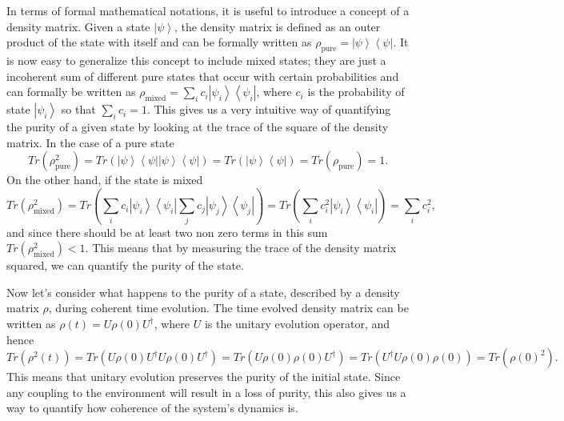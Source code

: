 In terms of formal mathematical notations, it is useful to introduce a concept of a density matrix. Given a state $\left|\psi \right>$, the density matrix is defined as an outer product of the state with itself and can be formally written as $\rho_{\mathrm{pure}} = \left|\psi \right> \left< \psi \right|$. It is now easy to generalize this concept to include mixed states; they are just a incoherent sum of different pure states that occur  with certain probabilities and can formally be written as $\rho_{\mathrm{mixed}} = \sum_{i} c_{i}\left|\psi_{i} \right> \left< \psi_{i} \right|$, where $c_{i}$ is the probability of state $\left|\psi_{i} \right>$ so that $\sum_{i}c_{i}=1$. This gives us a very intuitive way of quantifying the purity of a given state by looking at the trace of the square of the density matrix. In the case of a pure state 
\begin{equation}
Tr(\rho_{\mathrm{pure}}^2) = Tr(\left|\psi \right> \left< \psi \right| \left|\psi \right> \left< \psi \right|) = Tr(\left|\psi \right> \left< \psi \right|) = Tr(\rho_{\mathrm{pure}})=1.
\end{equation}
On the other hand, if the state is mixed
\begin{equation}
Tr(\rho_{\mathrm{mixed}}^2) = Tr(\sum_{i} c_{i}\left|\psi_{i} \right> \left< \psi_{i} \right| \sum_{j} c_{j}\left|\psi_{j} \right> \left< \psi_{j} \right|) = Tr(\sum_{i} c^2_{i}\left|\psi_{i} \right> \left< \psi_{i} \right|) = \sum_{i} c^2_{i},
\end{equation}
and since there should be at least two non zero terms in this sum $Tr(\rho_{\mathrm{mixed}}^2) <1$. This means that by measuring the trace of the density matrix squared, we can quantify the purity of the state. 

Now let's consider what happens to the purity of a state, described by a density matrix $\rho$, during coherent time evolution. The time evolved density matrix can be written as $\rho(t) = U\rho(0) U^{\dagger}$, where $U$ is the unitary evolution operator, and hence 
\begin{equation}
Tr(\rho^2(t)) = Tr(U\rho(0) U^{\dagger} U\rho(0) U^{\dagger}) = Tr(U\rho(0) \rho(0) U^{\dagger}) = Tr(U^{\dagger} U\rho(0) \rho(0))  = Tr(\rho(0)^2). 
\end{equation}
This means that unitary evolution preserves the purity of the initial state. Since any coupling to the environment will result in a loss of purity, this also gives us a way to quantify how coherence of the system's dynamics is.

